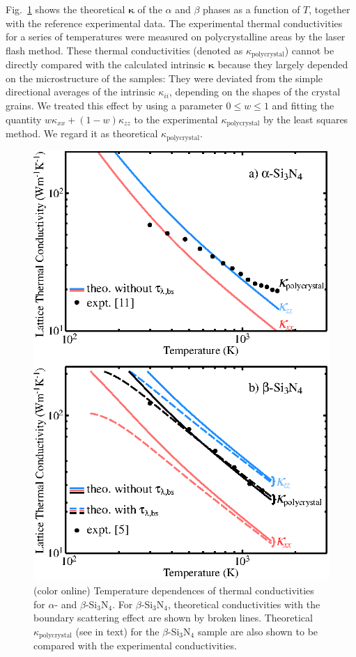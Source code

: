 \documentclass[twocolumn,amsmath,amssymb,a4paper,prb,superscriptaddress,floatfix]{revtex4-1}
\begin{document}
Fig.~\ref{fig:Fig1_338} shows the theoretical $\boldsymbol{\kappa}$ of the
$\alpha$ and $\beta$ phases as a function of $T$, together with the reference
experimental data\cite{hirosaki,hirai}. The experimental thermal conductivities
for a series of temperatures were measured on polycrystalline areas
by the laser flash method. These thermal conductivities (denoted as
$\kappa_\mathrm{polycrystal}$) cannot be directly compared with the calculated
intrinsic $\boldsymbol{\kappa}$ because they largely depended on the
microstructure of the samples: They were deviated from the simple directional
averages of the intrinsic $\kappa_{ii}$, depending on the shapes of the crystal
grains.  We treated this effect by using a parameter $0\le{w}\le{1}$ and fitting
the quantity $w\kappa_{xx} + (1-w) \kappa_{zz}$ to the experimental
$\kappa_\mathrm{polycrystal}$ by the least squares method. We regard it as
theoretical $\kappa_\mathrm{polycrystal}$. 

\begin{figure}[ht]
 \begin{center}
  \includegraphics[width=0.90\linewidth]{Fig1_m1010.eps} \caption{(color
  online) Temperature dependences of thermal conductivities for $\alpha$- and
  $\beta$-Si$_3$N$_4$. For $\beta$-Si$_3$N$_4$, theoretical conductivities with the
  boundary scattering effect are shown by broken lines. Theoretical
  $\kappa_\mathrm{polycrystal}$ 
  (see in text) for the $\beta$-Si$_3$N$_4$ sample are
  also shown to be compared with the experimental conductivities.}
  \label{fig:Fig1_338}
 \end{center}
\end{figure}
\end{document}
